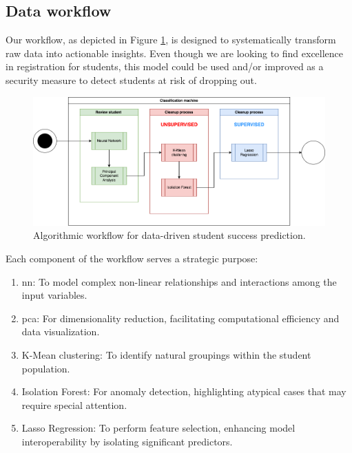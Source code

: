 \documentclass[../main.tex]{subfiles}
\begin{document}
\subsection{Data workflow}
\label{subsec:conceptualimplementation_dataworkflow}

Our workflow, as depicted in Figure \ref{fig:dataworkflow}, is designed to systematically transform raw data into actionable insights. Even though we are looking to find excellence in registration for students, this model could be used and/or improved as a security measure to detect students at risk of dropping out.

\begin{figure}
    \centering
    \includegraphics[width=1\linewidth]{res//diagram/ML Workflow.png}
    \caption{Algorithmic workflow for data-driven student success prediction.}
    \label{fig:dataworkflow}
\end{figure}

Each component of the workflow serves a strategic purpose:

\begin{enumerate}
    \item \acrfull{nn}: To model complex non-linear relationships and interactions among the input variables.
    \item \acrfull{pca}: For dimensionality reduction, facilitating computational efficiency and data visualization.
    \item K-Mean clustering: To identify natural groupings within the student population.
    \item Isolation Forest: For anomaly detection, highlighting atypical cases that may require special attention.
    \item Lasso Regression: To perform feature selection, enhancing model interoperability by isolating significant predictors.
\end{enumerate}
\end{document}
